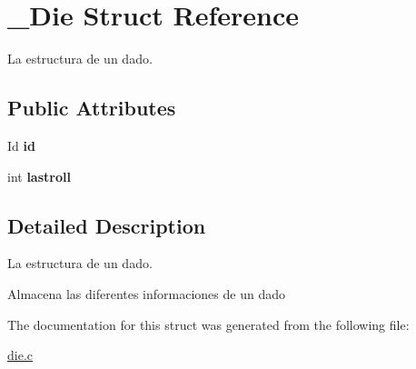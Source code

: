\hypertarget{struct__Die}{}\section{\+\_\+\+Die Struct Reference}
\label{struct__Die}


La estructura de un dado.  


\subsection*{Public Attributes}
\begin{DoxyCompactItemize}
\item 
\mbox{\label{struct__Die_a0887af562dda760409957f13619d36f1}} 
Id {\bfseries id}
\item 
\mbox{\label{struct__Die_a208faa7e773152a3e2d5c4821d32593c}} 
int {\bfseries lastroll}
\end{DoxyCompactItemize}


\subsection{Detailed Description}
La estructura de un dado. 

Almacena las diferentes informaciones de un dado 

The documentation for this struct was generated from the following file\+:\begin{DoxyCompactItemize}
\item 
\hyperlink{die_8c}{die.\+c}\end{DoxyCompactItemize}

